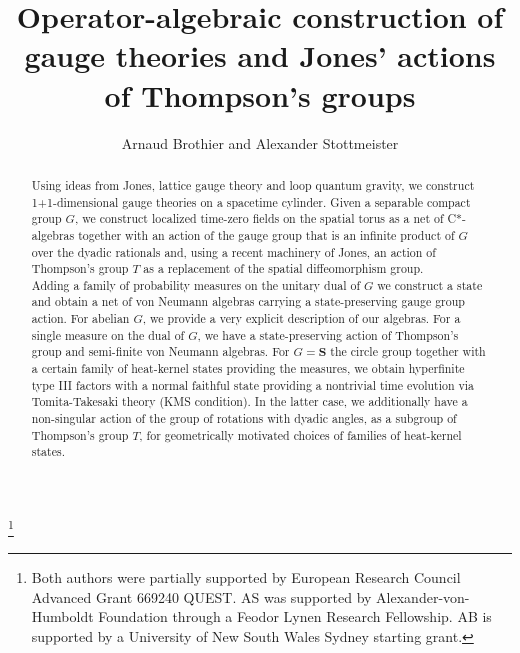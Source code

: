 \documentclass[a4paper,12pt]{amsart}
\numberwithin{equation}{section}
\theoremstyle{definition}
\newcommand{\fS}{\mathbf{S}}
\begin{document}
\title[Gauge theory and Thompson's groups]{Operator-algebraic construction of gauge theories and Jones' actions of Thompson's groups}
\thanks{Both authors were partially supported by European Research Council Advanced Grant 669240 QUEST. AS was supported by Alexander-von-Humboldt Foundation through a Feodor Lynen Research Fellowship.
AB is supported by a University of New South Wales Sydney starting grant.}
\author{Arnaud Brothier and Alexander Stottmeister}
\address{Arnaud Brothier\\ School of Mathematics and Statistics, University of New South Wales, Sydney NSW 2052, Australia\\
Tel.: +612 9385 7077}
\address{Alexander Stottmeister\\Department of Mathematics, University of Rome Tor Vergata, Via della Ricerca Scientifica 00133 Roma, Italy}

\thispagestyle{empty}


\begin{abstract}
Using ideas from Jones, lattice gauge theory and loop quantum gravity, we construct 1+1-dimensional gauge theories on a spacetime cylinder.
Given a separable compact group $G$, we construct localized time-zero fields on the spatial torus as a net of C*-algebras together with an action of the gauge group that is an infinite product of $G$ over the dyadic rationals and, using a recent machinery of Jones, an action of Thompson's group $T$ as a replacement of the spatial diffeomorphism group. \\
Adding a family of probability measures on the unitary dual of $G$ we construct a state and obtain a net of von Neumann algebras carrying a state-preserving gauge group action.
For abelian $G$, we provide a very explicit description of our algebras. 
For a single measure on the dual of $G$, we have a state-preserving action of Thompson's group and semi-finite von Neumann algebras.
For $G=\fS$ the circle group together with a certain family of heat-kernel states providing the measures, we obtain hyperfinite type III factors with a normal faithful state providing a nontrivial time evolution via Tomita-Takesaki theory (KMS condition). 
In the latter case, we additionally have a non-singular action of the group of rotations with dyadic angles, as a subgroup of Thompson's group $T$, for geometrically motivated choices of families of heat-kernel states.
\end{abstract}
\end{document}

